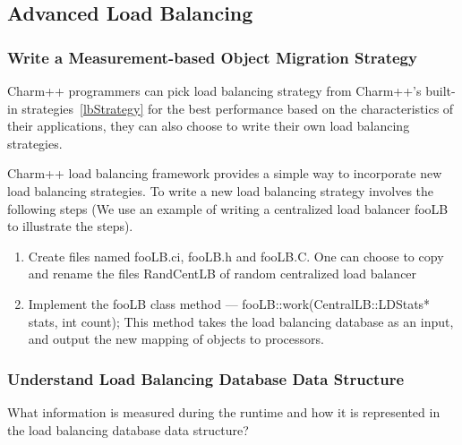 
\subsection{Advanced Load Balancing}
\label{advancedlb}

\subsubsection{Write a Measurement-based Object Migration Strategy}
\label{writelb}

Charm++ programmers can pick load balancing strategy from Charm++'s built-in
strategies~\ref{lbStrategy} for the best performance based on the 
characteristics of their applications, they can also choose to write their 
own load balancing strategies.

Charm++ load balancing framework provides a simple way to incorporate new 
load balancing strategies. To write a new load balancing strategy
involves the following steps (We use an example of writing a centralized
load balancer fooLB to illustrate the steps).

\begin{enumerate}
\item Create files named fooLB.ci, fooLB.h and fooLB.C. One can choose to
copy and rename the files RandCentLB of random centralized load balancer

\item Implement the fooLB class method --- fooLB::work(CentralLB::LDStats* stats, int count); This method takes the load balancing database as an input,
and output the new mapping of objects to processors.

\end{enumerate}


\subsubsection{Understand Load Balancing Database Data Structure}
\label{lbdatabase}

What information is measured during the runtime and how it is represented in
the load balancing database data structure?
